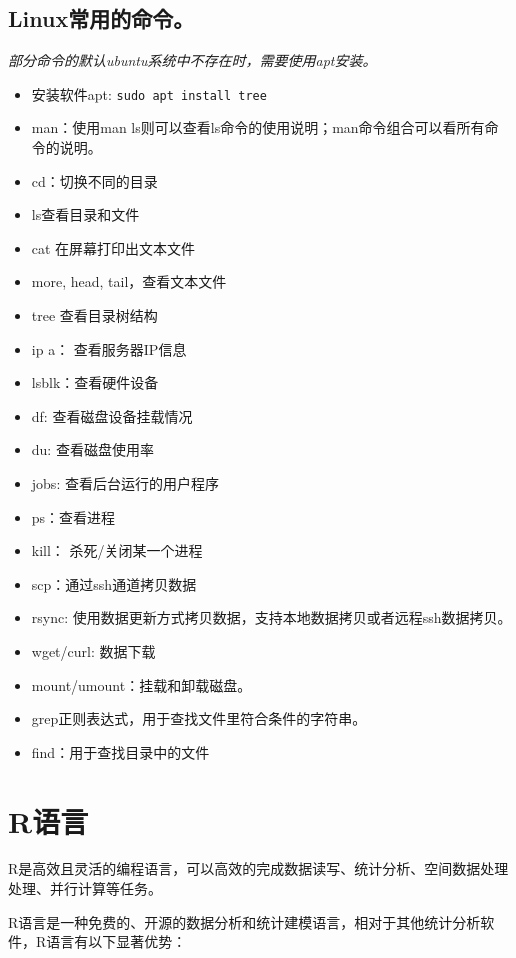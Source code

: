 \documentclass[
]{ctexbook}
\providecommand{\tightlist}{%
  \setlength{\itemsep}{0pt}\setlength{\parskip}{0pt}}
\begin{document}
\hypertarget{linuxux5e38ux7528ux7684ux547dux4ee4}{%
\subsection{Linux常用的命令。}\label{linuxux5e38ux7528ux7684ux547dux4ee4}}

\emph{部分命令的默认ubuntu系统中不存在时，需要使用apt安装。}

\begin{itemize}
\tightlist
\item
  安装软件apt: \texttt{sudo\ apt\ install\ tree}
\item
  man：使用man ls则可以查看ls命令的使用说明；man命令组合可以看所有命令的说明。
\item
  cd：切换不同的目录
\item
  ls查看目录和文件
\item
  cat 在屏幕打印出文本文件
\item
  more, head, tail，查看文本文件
\item
  tree 查看目录树结构
\item
  ip a： 查看服务器IP信息
\item
  lsblk：查看硬件设备
\item
  df: 查看磁盘设备挂载情况
\item
  du: 查看磁盘使用率
\item
  jobs: 查看后台运行的用户程序
\item
  ps：查看进程
\item
  kill： 杀死/关闭某一个进程
\item
  scp：通过ssh通道拷贝数据
\item
  rsync: 使用数据更新方式拷贝数据，支持本地数据拷贝或者远程ssh数据拷贝。
\item
  wget/curl: 数据下载
\item
  mount/umount：挂载和卸载磁盘。
\item
  grep正则表达式，用于查找文件里符合条件的字符串。
\item
  find：用于查找目录中的文件
\end{itemize}

\hypertarget{r}{%
\section{R语言}\label{r}}

R是高效且灵活的编程语言，可以高效的完成数据读写、统计分析、空间数据处理处理、并行计算等任务。

R语言是一种免费的、开源的数据分析和统计建模语言，相对于其他统计分析软件，R语言有以下显著优势：
\end{document}
